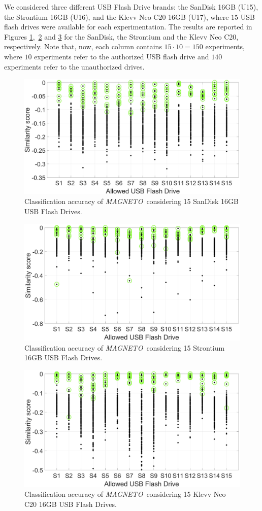 \documentclass[acmsmall, authorversion]{acmart}
\newcommand{\sol}{\emph{MAGNETO}}
\begin{document}
We considered three different USB Flash Drive brands: the SanDisk 16GB (U15), the Strontium 16GB (U16), and the Klevv Neo C20 16GB (U17), where $15$ USB flash drives were available for each experimentation. The results are reported in Figures \ref{fig:scenario2_sandisk},~\ref{fig:scenario2_strontium} and \ref{fig:scenario2_klevv} for the SanDisk, the Strontium and the Klevv Neo C20, respectively. Note that, now, each column contains $15 \cdot 10 = 150$ experiments, where $10$ experiments refer to the authorized USB flash drive and $140$ experiments refer to the unauthorized drives. \\
\begin{figure}[htbp]
    \includegraphics[width=.6\columnwidth]{Figures/scenario2_sandisk_final.png}
    \centering
    \caption{Classification accuracy of \sol\ considering 15 SanDisk 16GB USB Flash Drives.}
    \label{fig:scenario2_sandisk}
\end{figure}
\begin{figure}[htbp]
    \includegraphics[width=.6\columnwidth]{Figures/scenario2_strontium_final.png}
    \centering
    \caption{Classification accuracy of \sol\ considering 15 Strontium 16GB USB Flash Drives.}
    \label{fig:scenario2_strontium}
\end{figure}
\begin{figure}[htbp]
    \includegraphics[width=.6\columnwidth]{Figures/scenario2_klevv_final.png}
    \centering
    \caption{Classification accuracy of \sol\ considering 15 Klevv Neo C20 16GB USB Flash Drives.}
    \label{fig:scenario2_klevv}
\end{figure}
\end{document}
